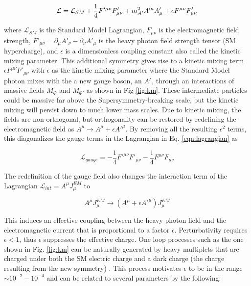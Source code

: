 
\begin{equation}
    \mathcal{L} = \mathcal{L}_{SM} + \frac{1}{4} F'^{\mu\nu}F'_{\mu\nu} + m^2_{A^\prime} A'^{\mu}A'_{\mu} + \epsilon F^{\mu\nu}F'_{\mu\nu}
    \label{eqn:lagrangian}
\end{equation}

where $\mathcal{L}_{SM}$ is the Standard Model Lagrangian, $F_{\mu\nu}$ is the electromagnetic field strength, $F'_{\mu\nu} = \partial_{\mu}A'_{\nu} - \partial_{\nu}A'_{\mu}$ is the heavy photon field strength tensor (SM hypercharge), and $\epsilon$ is a dimensionless coupling constant also called the kinetic mixing parameter. This additional symmetry gives rise to a kinetic mixing term $\epsilon F^{\mu\nu}F'_{\mu\nu}$ with $\epsilon$ as the kinetic mixing parameter where the Standard Model photon mixes with the a new gauge boson, an $A^\prime$, through an interactions of massive fields $M_{\Phi}$ and $M_{\Phi '}$ as shown in Fig \ref{fig:km}. These intermediate particles could be massive far above the Supersymmetry-breaking scale, but the kinetic mixing will persist down to much lower mass scales. Due to kinetic mixing, the fields are non-orthogonal, but orthogonality can be restored by redefining the electromagnetic field as $A^{\mu} \rightarrow A^{\mu}+ \epsilon A'^{\mu}$. By removing all the resulting $\epsilon^2$ terms, this diagonalizes the gauge terms in the Lagrangian in Eq. \ref{eqn:lagrangian} as

\begin{equation}
    \mathcal{L}_{gauge} = - \frac{1}{4} F'^{\mu\nu}F'_{\mu\nu} - \frac{1}{4} F^{\mu\nu}F_{\mu\nu}
    \label{eqn:gauge}
\end{equation}

The redefinition of the gauge field also changes the interaction term of the Lagrangian $\mathcal{L}_{int}=A^{\mu} J_{\mu}^{EM}$ to 

\begin{equation}
    A^{\mu} J_{\mu}^{EM} \rightarrow (A^{\mu}+\epsilon A'^{\mu}) J_{\mu}^{EM}
    \label{eqn:interaction}
\end{equation}

This induces an effective coupling between the heavy photon field and the electromagnetic current that is proportional to a factor $\epsilon$. Perturbativity requires $\epsilon<1$, thus $\epsilon$ suppresses the effective charge. One loop processes such as the one shown in Fig. \ref{fig:km} can be naturally generated by heavy multiplets that are charged under both the SM electric charge and a dark charge (the charge resulting from the new symmetry) \cite{ArkaniHamed:2008qp} \cite{Bjorken:2009mm}. This process motivates $\epsilon$ to be in the range $\sim 10^{-2}-10^{-4}$ and can be related to several parameters by the following:

